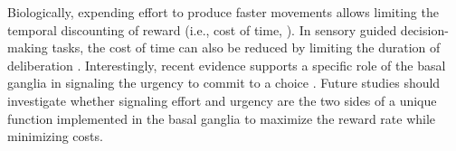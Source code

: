 Biologically, expending effort to produce faster movements allows limiting the temporal discounting of reward (i.e., cost of time, \cite{Shadmehr2019TINS}).
In sensory guided decision-making tasks, the cost of time can also be reduced by limiting the duration of deliberation \cite{Carland2019}. 
Interestingly, recent evidence supports a specific role of the basal ganglia in signaling the urgency to commit to a choice \cite{Thura2017Neuron,Carland2019}. 
Future studies should investigate whether signaling effort and urgency are the two sides of a unique function implemented in the basal ganglia to maximize the reward rate while minimizing costs.
